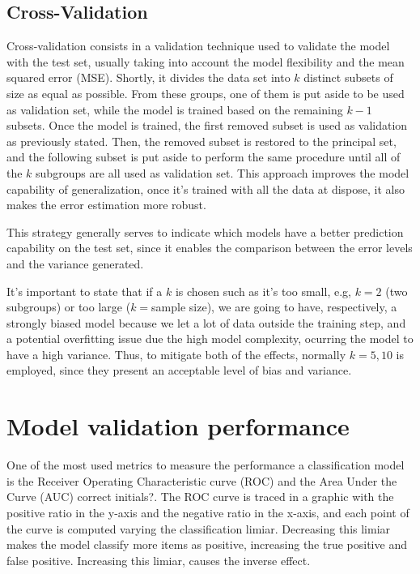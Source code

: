 \documentclass[conference]{IEEEtran}
\newcommand{\reviewNormal}[1]{{\color{yellow} #1}} %
\begin{document}
\subsection{Cross-Validation}

Cross-validation consists in a validation technique used to validate the model with the
test set, usually taking into account the model flexibility and the mean squared error (MSE).
Shortly, it divides the data set into $k$ distinct subsets of size as equal as 
possible. From these groups, one of them is put aside to be used as validation set,
while the model is trained based on the remaining $k-1$ subsets. Once the model is trained,
the first removed subset is used as validation as previously stated. Then, the removed 
subset is restored to the principal set, and the following subset is put aside to 
perform the same procedure until all of the $k$ subgroups are all used as validation set. 
This approach improves the model capability of generalization, once it's trained with 
all the data at dispose, it also makes the error estimation more robust.

This strategy generally serves to indicate which models have a better prediction capability
on the test set, since it enables the comparison between the error levels and the variance
generated.

It's important to state that if a $k$ is chosen such as it's too small, e.g, $k=2$ 
(two subgroups) or too large ($k=$sample size), we are going to have, respectively, a 
strongly biased model because we let a lot of data outside the training step, and a potential
overfitting issue due the high model complexity, ocurring the model to have a high variance.
Thus, to mitigate both of the effects, normally $k=5,10$ is employed, since they present
an acceptable level of bias and variance.

\section{Model validation performance}

One of the most used metrics to measure the performance a classification model is the
Receiver Operating Characteristic curve (ROC) and the Area Under the Curve (AUC) \reviewNormal{correct initials?}.
 The ROC curve is traced in a graphic with the positive ratio in the y-axis and the negative
ratio in the x-axis, and each point of the curve is computed varying the classification
limiar. Decreasing this limiar makes the model classify more items as positive, increasing
the true positive and false positive. Increasing this limiar, causes the inverse
effect.
\end{document}
